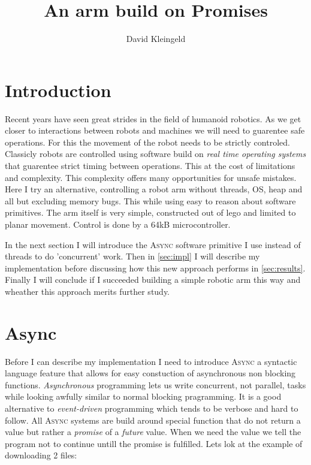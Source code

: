 \documentclass[lang=en, hanging-titles=true]{skrapport}
\title{An arm build on Promises}
\author[dskleingeld@gmail.com]{David Kleingeld}
\begin{document}
\maketitle
\tableofcontents

\section{Introduction}
Recent years have seen great strides in the field of humanoid robotics. As we get closer to interactions between robots and machines we will need to guarentee safe operations. For this the movement of the robot needs to be strictly controled. Classicly robots are controlled using software build on \textit{real time operating systems} that guarentee strict timing between operations. This at the cost of limitations and complexity. This complexity offers many opportunities for unsafe mistakes. Here I try an alternative, controlling a robot arm without threads, OS, heap and all but excluding memory bugs. This while using easy to reason about software primitives. The arm itself is very simple, constructed out of lego and limited to planar movement. Control is done by a 64kB microcontroller.

In the next section I will introduce the \textsc{Async} software primitive I use instead of threads to do 'concurrent' work. Then in \cref{sec:impl} I will describe my implementation before discussing how this new approach performs in \cref{sec:results}. Finally I will conclude if I succeeded building a simple robotic arm this way and wheather this approach merits further study.

\section{Async}
Before I can describe my implementation I need to introduce \textsc{Async} a syntactic language feature that allows for easy constuction of asynchronous non blocking functions. \textit{Asynchronous} programming lets us write concurrent, not parallel, tasks while looking awfully similar to normal blocking pragramming. It is a good alternative to \textit{event-driven} programming which tends to be verbose and hard to follow. All \textsc{Async} systems are build around special function that do not return a value but rather a \textit{promise} of a \textit{future} value. When we need the value we tell the program not to continue untill the promise is fulfilled. Lets lok at the example of downloading 2 files:
\end{document}
